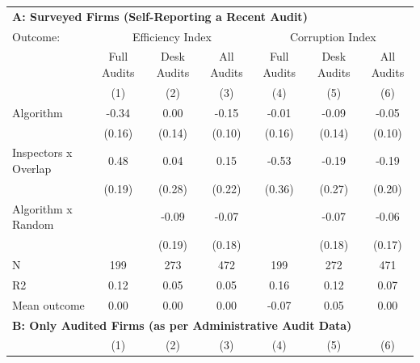 \begin{tabular}{lccc|ccc} \toprule
\multicolumn{7}{l}{\textbf{A: Surveyed Firms (Self-Reporting a Recent Audit)}} \\ \multicolumn{1}{l}{Outcome:} & \multicolumn{3}{c}{Efficiency Index} & \multicolumn{3}{c}{Corruption Index} \\ \multicolumn{1}{l}{} & Full Audits & Desk Audits & All Audits & Full Audits & Desk Audits & All Audits \\ \multicolumn{1}{l}{} & (1) & (2) & (3) & (4) & (5) & (6) \\ \midrule
Algorithm   &       -0.34\sym{**} &        0.00         &       -0.15         &       -0.01         &       -0.09         &       -0.05         \\
            &      (0.16)         &      (0.14)         &      (0.10)         &      (0.16)         &      (0.14)         &      (0.10)         \\
\addlinespace
Inspectors x Overlap&        0.48\sym{**} &        0.04         &        0.15         &       -0.53         &       -0.19         &       -0.19         \\
            &      (0.19)         &      (0.28)         &      (0.22)         &      (0.36)         &      (0.27)         &      (0.20)         \\
\addlinespace
Algorithm x Random&                     &       -0.09         &       -0.07         &                     &       -0.07         &       -0.06         \\
            &                     &      (0.19)         &      (0.18)         &                     &      (0.18)         &      (0.17)         \\
\midrule
N           &         199         &         273         &         472         &         199         &         272         &         471         \\
R2          &        0.12         &        0.05         &        0.05         &        0.16         &        0.12         &        0.07         \\
Mean outcome&        0.00         &        0.00         &        0.00         &       -0.07         &        0.05         &        0.00         \\

\midrule \multicolumn{7}{l}{\textbf{B: Only Audited Firms (as per Administrative Audit Data)}} \\ \multicolumn{1}{l}{} & (1) & (2) & (3) & (4) & (5) & (6) \\ \midrule


\end{tabular}
